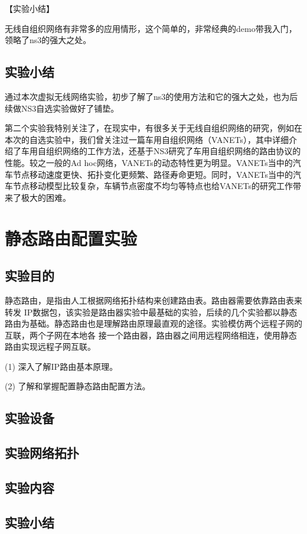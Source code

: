 \documentclass[lang=cn,11pt,a4paper,cite=authoryear]{elegantpaper}
\begin{document}
【实验小结】

无线自组织网络有非常多的应用情形，这个简单的，非常经典的demo带我入门，领略了ns3的强大之处。

\subsection{实验小结}

通过本次虚拟无线网络实验，初步了解了ns3的使用方法和它的强大之处，也为后续做NS3自选实验做好了铺垫。

第二个实验我特别关注了，在现实中，有很多关于无线自组织网络的研究，例如在本次的自选实验中，我们曾关注过一篇车用自组织网络（VANETs），其中详细介绍了车用自组织网络的工作方法，还基于NS3研究了车用自组织网络的路由协议的性能。较之一般的Ad hoc网络，VANETs的动态特性更为明显。VANETs当中的汽车节点移动速度更快、拓扑变化更频繁、路径寿命更短。同时，VANETs当中的汽车节点移动模型比较复杂，车辆节点密度不均匀等特点也给VANETs的研究工作带来了极大的困难。

\section{静态路由配置实验}
\subsection{实验目的}

静态路由，是指由人工根据网络拓扑结构来创建路由表。路由器需要依靠路由表来转发 IP数据包，该实验是路由器实验中最基础的实验，后续的几个实验都以静态路由为基础。静态路由也是理解路由原理最直观的途径。实验模仿两个远程子网的互联，两个子网在本地各 接一个路由器，路由器之间用远程网络相连，使用静态路由实现远程子网互联。

(1)	深入了解IP路由基本原理。

(2)	了解和掌握配置静态路由配置方法。

\subsection{实验设备}


\subsection{实验网络拓扑}
\subsection{实验内容}
\subsection{实验小结}
\end{document}
